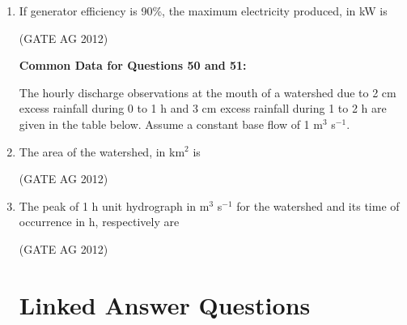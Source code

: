 \documentclass[journal]{IEEEtran}
\begin{document}
\begin{enumerate}
\item
 If generator efficiency is 90\%, the maximum electricity produced, in kW is
\begin{enumerate}
\end{enumerate}
\hfill(GATE AG 2012)\\

\medskip

\textbf{Common Data for Questions 50 and 51:}

The hourly discharge observations at the mouth of a watershed due to 2 cm excess rainfall during 0 to 1 h and 3 cm excess rainfall during 1 to 2 h are given in the table below. Assume a constant base flow of 1 m$^3$ s$^{-1}$.



\item
 The area of the watershed, in km$^2$ is
\begin{enumerate}
\end{enumerate}
\hfill(GATE AG 2012)\\

\medskip

\item
 The peak of 1 h unit hydrograph in m$^3$ s$^{-1}$ for the watershed and its time of occurrence in h, respectively are
\begin{enumerate}
\end{enumerate}
\hfill(GATE AG 2012)\\

\medskip

\section*{Linked Answer Questions}


\end{enumerate}
\end{document}
